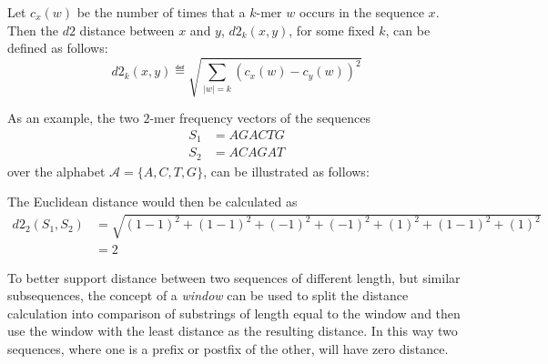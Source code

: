 Let $c_x(w)$ be the number of times that a $k$-mer $w$ occurs in the sequence
$x$. Then the $d2$ distance between $x$ and $y$, $d2_k(x,y)$, for some fixed
$k$, can be defined as
follows:
\begin{equation}
  d2_k(x,y) \eqdef \sqrt{\sum_{|w|=k} (c_x(w) - c_y(w))^2}
\end{equation}

As an example, the two $2$-mer frequency vectors of the sequences
\begin{align*}
  S_1 &= AGACTG \\
  S_2 &= ACAGAT
\end{align*}
over the alphabet $\mathcal{A} = \{A,C,T,G\}$, can be illustrated as follows:

\begin{table}[!h]
\centering
{}
\end{table}

The Euclidean distance would then be calculated as
\begin{align*}
  d2_2(S_1, S_2)
    &= \sqrt{(1-1)^2 + (1-1)^2 + (-1)^2 + (-1)^2 + (1)^2 + (1-1)^2 + (1)^2} \\
    &= 2
\end{align*}

To better support distance between two sequences of different length, but
similar subsequences, the concept of a \emph{window} can be used to split the
distance calculation into comparison of substrings of length equal to the
window and then use the window with the least distance as the resulting
distance. In this way two sequences, where one is a prefix or postfix of the
other, will have zero distance.




